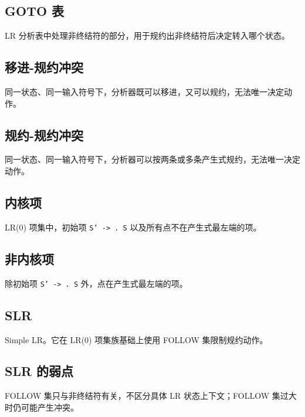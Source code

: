 \documentclass[UTF8,zihao=-4]{ctexart}
\begin{document}
\subsection*{GOTO 表}

LR 分析表中处理非终结符的部分，用于规约出非终结符后决定转入哪个状态。

\subsection*{移进-规约冲突}

同一状态、同一输入符号下，分析器既可以移进，又可以规约，无法唯一决定动作。

\subsection*{规约-规约冲突}

同一状态、同一输入符号下，分析器可以按两条或多条产生式规约，无法唯一决定动作。

\subsection*{内核项}

LR(0) 项集中，初始项 \texttt{S' -> . S} 以及所有点不在产生式最左端的项。

\subsection*{非内核项}

除初始项 \texttt{S' -> . S} 外，点在产生式最左端的项。

\subsection*{SLR}

Simple LR。它在 LR(0) 项集族基础上使用 FOLLOW 集限制规约动作。

\subsection*{SLR 的弱点}

FOLLOW 集只与非终结符有关，不区分具体 LR 状态上下文；FOLLOW 集过大时仍可能产生冲突。
\end{document}
